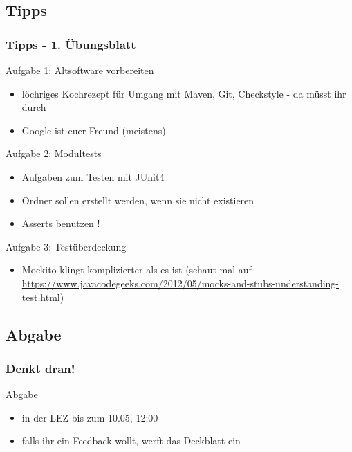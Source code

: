 \documentclass[18pt]{beamer}
\begin{document}
	\subsection{Tipps}
	\begin{frame}
		\frametitle{Tipps - 1. Übungsblatt}
		\begin{small}
			\begin{exampleblock}{Aufgabe 1: Altsoftware vorbereiten}
				\begin{itemize}
					\item löchriges Kochrezept für Umgang mit Maven, Git, Checkstyle - da müsst ihr durch
					\item Google ist euer Freund (meistens)
				\end{itemize}
			\end{exampleblock}
			\pause
			\begin{exampleblock}{Aufgabe 2: Modultests}
				\begin{itemize}
					\item Aufgaben zum Testen mit JUnit4
					\item Ordner sollen erstellt werden, wenn sie nicht existieren
					\item Asserts benutzen !
				\end{itemize}
			\end{exampleblock}
			\pause
			\begin{exampleblock}{Aufgabe 3: Testüberdeckung}
				\begin{itemize}
					\item Mockito klingt komplizierter als es ist (schaut mal auf \url{https://www.javacodegeeks.com/2012/05/mocks-and-stubs-understanding-test.html})
				\end{itemize}
			\end{exampleblock}
		\end{small}
	\end{frame}
	
	\subsection{Abgabe}
	\begin{frame}
		\frametitle{Denkt dran!}
		\begin{alertblock}{Abgabe}
			\begin{itemize}
				\item in der LEZ bis zum 10.05, 12:00
				\item falls ihr ein Feedback wollt, werft das Deckblatt ein
			\end{itemize}
		\end{alertblock}
	\end{frame}
		
\end{document}
